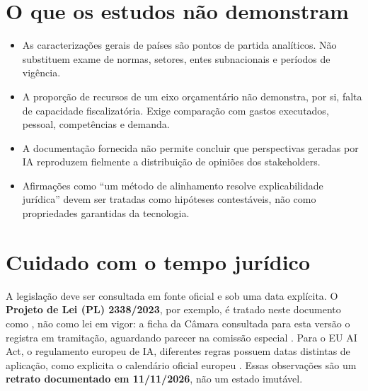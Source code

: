 \documentclass[12pt,a4paper,oneside,english,brazil]{abntex2}
\newcommand{\term}[1]{{\mdseries\ttfamily\small\seqsplit{#1}}}
\begin{document}
\section{O que os estudos não demonstram}
\begin{itemize}
\item As caracterizações gerais de países são pontos de partida analíticos. Não substituem exame de normas, setores, entes subnacionais e períodos de vigência.
\item A proporção de recursos de um eixo orçamentário não demonstra, por si, falta de capacidade fiscalizatória. Exige comparação com gastos executados, pessoal, competências e demanda.
\item A documentação fornecida não permite concluir que perspectivas geradas por IA reproduzem fielmente a distribuição de opiniões dos stakeholders.
\item Afirmações como ``um método de alinhamento resolve explicabilidade jurídica'' devem ser tratadas como hipóteses contestáveis, não como propriedades garantidas da tecnologia.
\end{itemize}

\section{Cuidado com o tempo jurídico}
A legislação deve ser consultada em fonte oficial e sob uma data explícita. O \textbf{Projeto de Lei (PL) 2338/2023}, por exemplo, é tratado neste documento como \term{LegislativeProposal}, não como lei em vigor: a ficha da Câmara consultada para esta versão o registra em tramitação, aguardando parecer na comissão especial \cite{camara-pl2338}. Para o EU AI Act, o regulamento europeu de IA, diferentes regras possuem datas distintas de aplicação, como explicita o calendário oficial europeu \cite{ec-aiact-timeline}. Essas observações são um \textbf{retrato documentado em 11/11/2026}, não um estado imutável.
\end{document}
